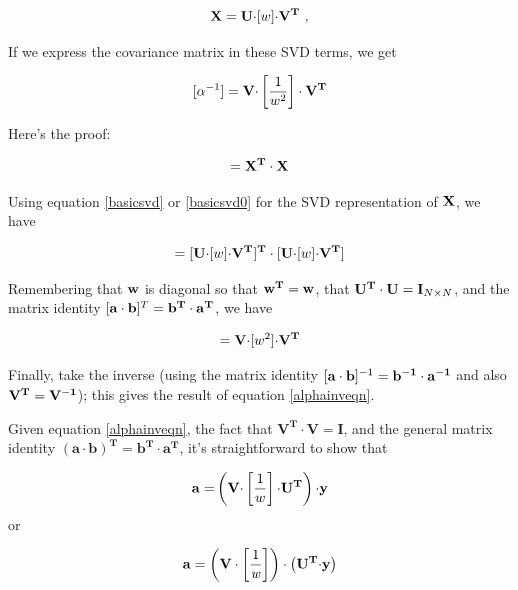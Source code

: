 \documentclass[psfig,preprint]{aastex}
\begin{document}
\begin{equation} \label{basicsvd0}
{\bf X} = {\bf U \cdot} [ w ] {\bf \cdot V^T}
\ ,
\end{equation}

\noindent If we express the covariance matrix in these SVD terms, we get

\begin{equation} \label{alphainveqn}
[\alpha ^{-1}] = {\bf V \cdot} \left[ 1 \over w^2 \right] \cdot {\bf V^T}
\end{equation}

\noindent Here's the proof: \begin{mathletters}
\begin{equation}
[ \alpha ] = {\bf X^T \cdot X} 
\end{equation}

\noindent Using equation \ref{basicsvd} or \ref{basicsvd0} for the SVD
representation of ${\bf X}$, we have

\begin{equation}
[ \alpha ] = [{\bf U \cdot} [w] {\bf \cdot V^T]^T \cdot [ U \cdot} [w]
  {\bf \cdot V^T]} 
\end{equation}

\noindent Remembering that ${\bf w}$ is diagonal so that ${\bf w^T =
  w}$, that ${\bf U^T \cdot U = I}_{N \times N}$, and the matrix
  identity ${[\bf a \cdot b}]^T = {\bf b^T \cdot a^T}$, we have

\begin{equation}
[ \alpha] = {\bf V \cdot} [w^2] {\bf \cdot V^T}
\end{equation}

\noindent Finally, take the inverse (using the matrix identity 
${[\bf a \cdot b}]^{-1} = {\bf b^{-1} \cdot a^{-1}}$ and also ${\bf V^T =
    V^{-1}}$); this gives the result of equation \ref{alphainveqn}.
\end{mathletters}

\noindent Given equation \ref{alphainveqn}, the fact that $\mathbf{V^T
\cdot V = I}$, and the general matrix identity $\mathbf{(a \cdot b)^T =
b^T \cdot a^T}$, it's straightforward to show that

\begin{mathletters}
\begin{equation} \label{aeqn}
\mathbf{ a = }  \left( \mathbf{V \cdot} \left[ {1 \over w} \right]
\mathbf{ \cdot U^T } \right) \mathbf{\cdot y}
\end{equation}
\noindent or


\begin{equation} \label{aeqn1}
\mathbf{ a =   \left( V \cdot \left[  {\rm 1} \over {\it w} \right] \right)
\cdot \left( U^T   \mathbf{\cdot y} \right) }
\end{equation}
\end{mathletters}
\end{document}
